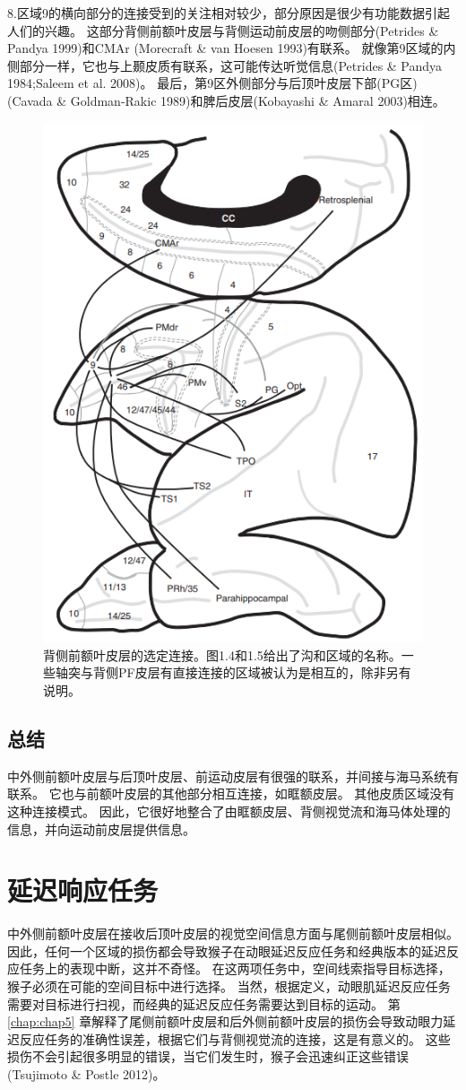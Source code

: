 8.区域9的横向部分的连接受到的关注相对较少，部分原因是很少有功能数据引起人们的兴趣。
这部分背侧前额叶皮层与背侧运动前皮层的吻侧部分(Petrides \& Pandya 1999)和CMAr (Morecraft \& van Hoesen 1993)有联系。
就像第9区域的内侧部分一样，它也与上颞皮质有联系，这可能传达听觉信息(Petrides \& Pandya 1984;Saleem et al. 2008)。
最后，第9区外侧部分与后顶叶皮层下部(PG区)(Cavada \& Goldman-Rakic 1989)和脾后皮层(Kobayashi \& Amaral 2003)相连。


\begin{figure}
	\centering
	\includegraphics[width=0.5\linewidth]{image_pfc/Fig_6_2}
	\caption{背侧前额叶皮层的选定连接。图1.4和1.5给出了沟和区域的名称。一些轴突与背侧PF皮层有直接连接的区域被认为是相互的，除非另有说明。}
	\label{fig:fig}
\end{figure}



\subsection{总结}

中外侧前额叶皮层与后顶叶皮层、前运动皮层有很强的联系，并间接与海马系统有联系。
它也与前额叶皮层的其他部分相互连接，如眶额皮层。
其他皮质区域没有这种连接模式。
因此，它很好地整合了由眶额皮层、背侧视觉流和海马体处理的信息，并向运动前皮层提供信息。



\section{延迟响应任务}

中外侧前额叶皮层在接收后顶叶皮层的视觉空间信息方面与尾侧前额叶皮层相似。
因此，任何一个区域的损伤都会导致猴子在动眼延迟反应任务和经典版本的延迟反应任务上的表现中断，这并不奇怪。
在这两项任务中，空间线索指导目标选择，猴子必须在可能的空间目标中进行选择。
当然，根据定义，动眼肌延迟反应任务需要对目标进行扫视，而经典的延迟反应任务需要达到目标的运动。
第 \ref{chap:chap5} 章解释了尾侧前额叶皮层和后外侧前额叶皮层的损伤会导致动眼力延迟反应任务的准确性误差，根据它们与背侧视觉流的连接，这是有意义的。
这些损伤不会引起很多明显的错误，当它们发生时，猴子会迅速纠正这些错误(Tsujimoto \& Postle 2012)。


